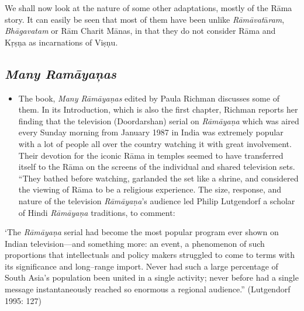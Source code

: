 We shall now look at the nature of some other adaptations, mostly of the Rāma story. It can easily be seen that most of them have been unlike \textit{Rāmāvat}ā\textit{ram}, \textit{Bhāgavatam} or Rām Charit Mānas, in that they do not consider Rāma and Kṛṣṇa as incarnations of Viṣṇu.


\subsection*{\textit{Many Ramāyaņas}}

\begin{itemize}
\item The book, \textit{Many Rāmāyaṇas} edited by Paula Richman discusses some of them. In its Introduction, which is also the first chapter, Richman reports her finding that the television (Doordarshan) serial on \textit{Rāmāyaṇa} which was aired every Sunday morning from January 1987 in India was extremely popular with a lot of people all over the country watching it with great involvement. Their devotion for the iconic Rāma in temples seemed to have transferred itself to the Rāma on the screens of the individual and shared television sets. “They bathed before watching, garlanded the set like a shrine, and considered the viewing of Rāma to be a religious experience. The size, response, and nature of the television \textit{Rāmāyaṇa}'s audience led Philip Lutgendorf a scholar of Hindi \textit{Rāmāyaṇa} traditions, to comment:

\end{itemize}

\begin{myquote}
‘The \textit{Rāmāyaṇa} serial had become the most popular program ever shown on Indian television—and something more: an event, a phenomenon of such proportions that intellectuals and policy makers struggled to come to terms with its significance and long–range import. Never had such a large percentage of South Asia's population been united in a single activity; never before had a single message instantaneously reached so enormous a regional audience.” (Lutgendorf 1995: 127)
\end{myquote}

